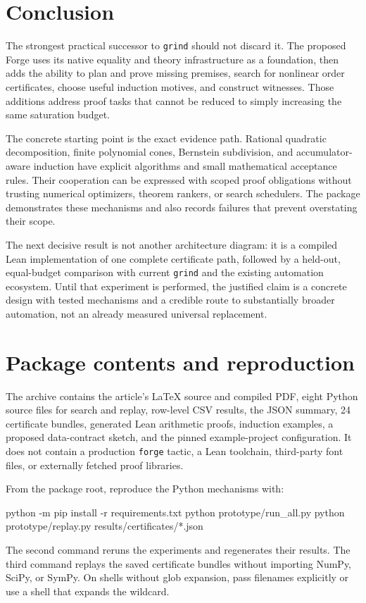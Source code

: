 \documentclass[11pt,letterpaper]{article}
\newcommand{\Lean}{\textsf{Lean}}
\newcommand{\Forge}{\textsf{Forge}}
\newcommand{\grind}{\texttt{grind}}
\theoremstyle{definition}
\theoremstyle{remark}
\begin{document}
\section{Conclusion}
The strongest practical successor to \grind{} should not discard it. The proposed \Forge{} uses its native equality and theory infrastructure as a foundation, then adds the ability to plan and prove missing premises, search for nonlinear order certificates, choose useful induction motives, and construct witnesses. Those additions address proof tasks that cannot be reduced to simply increasing the same saturation budget.

The concrete starting point is the exact evidence path. Rational quadratic decomposition, finite polynomial cones, Bernstein subdivision, and accumulator-aware induction have explicit algorithms and small mathematical acceptance rules. Their cooperation can be expressed with scoped proof obligations without trusting numerical optimizers, theorem rankers, or search schedulers. The package demonstrates these mechanisms and also records failures that prevent overstating their scope.

The next decisive result is not another architecture diagram: it is a compiled \Lean{} implementation of one complete certificate path, followed by a held-out, equal-budget comparison with current \grind{} and the existing automation ecosystem. Until that experiment is performed, the justified claim is a concrete design with tested mechanisms and a credible route to substantially broader automation, not an already measured universal replacement.

\appendix
\section{Package contents and reproduction}
The archive contains the article's \LaTeX{} source and compiled PDF, eight Python source files for search and replay, row-level CSV results, the JSON summary, 24 certificate bundles, generated \Lean{} arithmetic proofs, induction examples, a proposed data-contract sketch, and the pinned example-project configuration. It does not contain a production \texttt{forge} tactic, a \Lean{} toolchain, third-party font files, or externally fetched proof libraries.

From the package root, reproduce the Python mechanisms with:
\begin{code}
python -m pip install -r requirements.txt
python prototype/run_all.py
python prototype/replay.py results/certificates/*.json
\end{code}
The second command reruns the experiments and regenerates their results. The third command replays the saved certificate bundles without importing NumPy, SciPy, or SymPy. On shells without glob expansion, pass filenames explicitly or use a shell that expands the wildcard.
\end{document}

